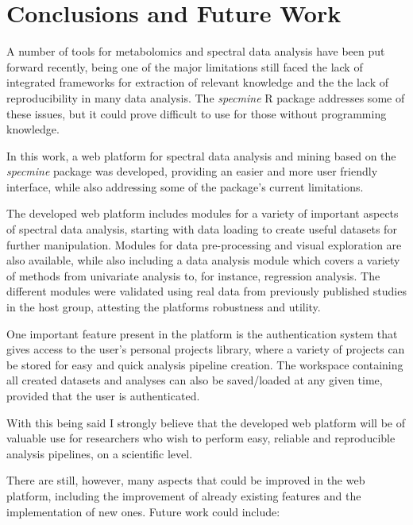 
\chapter{Conclusions and Future Work}

A number of tools for metabolomics and spectral data analysis have been put forward recently, being one of the major limitations still faced the lack of integrated frameworks for extraction of relevant knowledge and the the lack of reproducibility in many data analysis. The \textit{specmine} R package addresses some of these issues, but it could prove difficult to use for those without programming knowledge. 

In this work, a web platform for spectral data analysis and mining based on the \textit{specmine} package was developed, providing an easier and more user friendly interface, while also addressing some of the package's current limitations.

The developed web platform includes modules for a variety of important
aspects of spectral data analysis, starting with data loading to create useful datasets for further manipulation. Modules for data pre-processing and visual exploration are also available, while also including a data analysis module which covers a variety of methods from univariate analysis to, for instance, regression analysis. The different modules were validated using real data from previously published studies in the host group, attesting the platforms robustness and utility.

One important feature present in the platform is the authentication system that gives access to the user's personal projects library, where a variety of projects can be stored for easy and quick analysis pipeline creation. The workspace containing all created datasets and analyses can also be saved/loaded at any given time, provided that the user is authenticated.

With this being said I strongly believe that the developed web platform will be of valuable use for researchers who wish to perform easy, reliable and reproducible analysis pipelines, on a scientific level.

There are still, however, many aspects that could be improved in the web platform, including the improvement of already existing features and the implementation of new ones. Future work could include:


